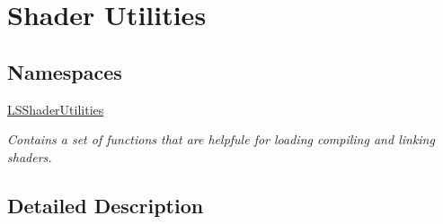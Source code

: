 \hypertarget{group___l_s_shader_utilities}{}\section{Shader Utilities}
\label{group___l_s_shader_utilities}
\subsection*{Namespaces}
\begin{DoxyCompactItemize}
\item 
 \hyperlink{namespace_l_s_shader_utilities}{L\+S\+Shader\+Utilities}
\begin{DoxyCompactList}\small\item\em Contains a set of functions that are helpfule for loading compiling and linking shaders. \end{DoxyCompactList}\end{DoxyCompactItemize}


\subsection{Detailed Description}
